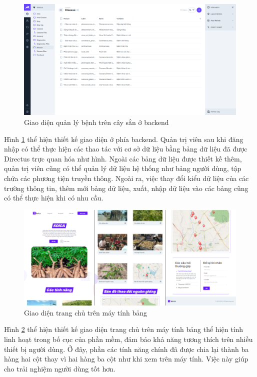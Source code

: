\documentclass[./../main.tex]{subfiles}
\begin{document}
\begin{figure}[H]
\centering
    \includegraphics[width=\textwidth,height=\textheight,keepaspectratio]{./img/kltn_be.png}
    \caption{Giao diện quản lý bệnh trên cây sắn ở backend}
    \label{ui:kltn_be}
\end{figure}
Hình \ref{ui:kltn_be} thể hiện thiết kế giao diện ở phía backend. Quản trị viên sau khi đăng nhập có thể thực hiện các thao tác với cơ sở dữ liệu bằng bảng dữ liệu đã được Directus trực quan hóa như hình. Ngoài các bảng dữ liệu được thiết kế thêm, quản trị viên cũng có thể quản lý dữ liệu hệ thống như bảng người dùng, tập chứa các phương tiện truyền thông. Ngoài ra, việc thay đổi kiểu dữ liệu của các trường thông tin, thêm mới bảng dữ liệu, xuất, nhập dữ liệu vào các bảng cũng có thể thực hiện khi có nhu cầu.

\begin{figure}[H]
\centering
    \includegraphics[width=\textwidth,height=\textheight,keepaspectratio]{./img/kltn_responsive.png}
    \caption{Giao diện trang chủ trên máy tính bảng}
    \label{ui:kltn_responsive}
\end{figure}
Hình \ref{ui:kltn_responsive} thể hiện thiết kế giao diện trang chủ trên máy tính bảng thể hiện tính linh hoạt trong bố cục của phần mềm, đảm bảo khả năng tương thích trên nhiều thiết bị người dùng. Ở đây, phần các tính năng chính đã được chia lại thành ba hàng hai cột thay vì hai hàng ba cột như khi xem trên máy tính. Việc này giúp cho trải nghiệm người dùng tốt hơn.
\end{document}
